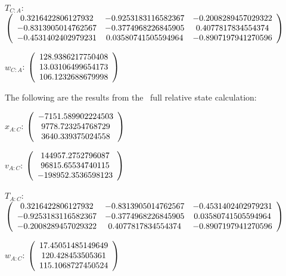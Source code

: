 \begin{description}
$T_{C:A}$: $\left( \begin{array} {ccc}
0.3216422806127932 &   -0.9253183116582367 &   -0.2008289457029322 \\
 -0.8313905014762567 &   -0.3774968226845905 &    0.4077817834554374 \\
  -0.4531402402979231 &   0.03580741505594964 &   -0.8907197941270596 \\
\end{array} \right)\\ \\$

$w_{C:A}$:  $\left( \begin{array} {ccc}
 128.9386217750408 \\     13.03106499654173 \\     106.1232688679998
\end{array} \right)\\ \\$

The following are the results from the \ full relative state calculation:

$x_{A:C}$: $\left( \begin{array} {ccc}  -7151.589902224503 \\     9778.723254768729 \\     3640.339375024558
\end{array} \right)\\ \\$

$v_{A:C}$:  $\left( \begin{array} {ccc}  144957.2752796087 \\     96815.65534740115 \\    -198952.3536598123
\end{array} \right)\\ \\$

$T_{A:C}$: $\left( \begin{array} {ccc}
 0.3216422806127932 &   -0.8313905014762567 &   -0.4531402402979231 \\
  -0.9253183116582367 &   -0.3774968226845905 &   0.03580741505594964 \\
   -0.2008289457029322 &    0.4077817834554374 &   -0.8907197941270596 \\
\end{array} \right)\\ \\$

$w_{A:C}$:  $\left( \begin{array} {ccc}  17.45051485149649 \\      120.428453505361 \\     115.1068727450524
\end{array} \right)\\ \\$


\end{description}
